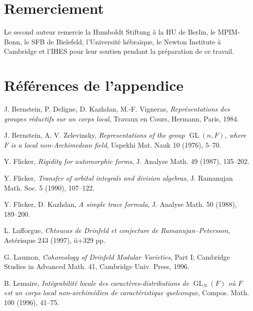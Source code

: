 \documentclass[10pt]{article}
\newcommand{\GL}{\operatorname{GL}}
\theoremstyle{deligne}
\begin{document}
\section*{Remerciement}
Le second auteur remercie la Humboldt Stiftung à la HU de Berlin, le MPIM-Bonn, le SFB de Bielefeld, l'Université hébraïque, le Newton Institute à Cambridge et l'IHES pour leur soutien pendant la préparation de ce travail.

\section*{Références de l'appendice}
\begin{description}[leftmargin=2.7em,labelwidth=2.4em,style=nextline]
\item[{[BDKV]}] J. Bernstein, P. Deligne, D. Kazhdan, M.-F. Vigneras, \emph{Représentations des groupes réductifs sur un corps local}, Travaux en Cours, Hermann, Paris, 1984.
\item[{[BZ]}] J. Bernstein, A. V. Zelevinsky, \emph{Representations of the group $\GL(n,F)$, where $F$ is a local non-Archimedean field}, Uspekhi Mat. Nauk 10 (1976), 5--70.
\item[{[F1]}] Y. Flicker, \emph{Rigidity for automorphic forms}, J. Analyse Math. 49 (1987), 135--202.
\item[{[F2]}] Y. Flicker, \emph{Transfer of orbital integrals and division algebras}, J. Ramanujan Math. Soc. 5 (1990), 107--122.
\item[{[FK]}] Y. Flicker, D. Kazhdan, \emph{A simple trace formula}, J. Analyse Math. 50 (1988), 189--200.
\item[{[Laf]}] L. Lafforgue, \emph{Chtoucas de Drinfeld et conjecture de Ramanujan--Petersson}, Astérisque 243 (1997), ii+329 pp.
\item[{[Lau]}] G. Laumon, \emph{Cohomology of Drinfeld Modular Varieties}, Part I; Cambridge Studies in Advanced Math. 41, Cambridge Univ. Press, 1996.
\item[{[Le]}] B. Lemaire, \emph{Intégrabilité locale des caractères-distributions de $\GL_N(F)$ où $F$ est un corps local non-archimédien de caractéristique quelconque}, Compos. Math. 100 (1996), 41--75.
\end{description}
\end{document}
